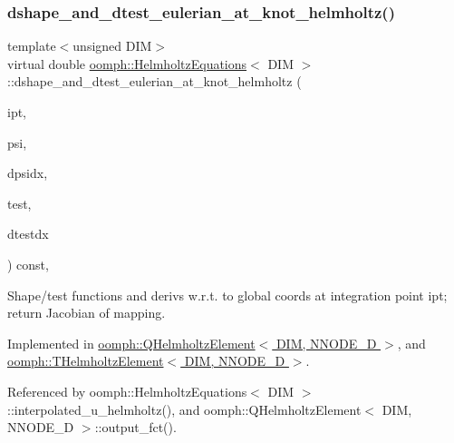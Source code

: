 \subsubsection{\texorpdfstring{dshape\+\_\+and\+\_\+dtest\+\_\+eulerian\+\_\+at\+\_\+knot\+\_\+helmholtz()}{dshape\_and\_dtest\_eulerian\_at\_knot\_helmholtz()}}
{\footnotesize\ttfamily template$<$unsigned D\+IM$>$ \\
virtual double \hyperlink{classoomph_1_1HelmholtzEquations}{oomph\+::\+Helmholtz\+Equations}$<$ D\+IM $>$\+::dshape\+\_\+and\+\_\+dtest\+\_\+eulerian\+\_\+at\+\_\+knot\+\_\+helmholtz (\begin{DoxyParamCaption}\item[{const unsigned \&}]{ipt,  }\item[{\hyperlink{classoomph_1_1Shape}{Shape} \&}]{psi,  }\item[{\hyperlink{classoomph_1_1DShape}{D\+Shape} \&}]{dpsidx,  }\item[{\hyperlink{classoomph_1_1Shape}{Shape} \&}]{test,  }\item[{\hyperlink{classoomph_1_1DShape}{D\+Shape} \&}]{dtestdx }\end{DoxyParamCaption}) const\hspace{0.3cm}{\ttfamily [protected]}, {}}



Shape/test functions and derivs w.\+r.\+t. to global coords at integration point ipt; return Jacobian of mapping. 



Implemented in \hyperlink{classoomph_1_1QHelmholtzElement_ade0cbf9a26ee1ac1f64fd999d8903a72}{oomph\+::\+Q\+Helmholtz\+Element$<$ D\+I\+M, N\+N\+O\+D\+E\+\_\+D $>$}, and \hyperlink{classoomph_1_1THelmholtzElement_abe87fe860e1034b235df82f134a8c7f7}{oomph\+::\+T\+Helmholtz\+Element$<$ D\+I\+M, N\+N\+O\+D\+E\+\_\+D $>$}.



Referenced by oomph\+::\+Helmholtz\+Equations$<$ D\+I\+M $>$\+::interpolated\+\_\+u\+\_\+helmholtz(), and oomph\+::\+Q\+Helmholtz\+Element$<$ D\+I\+M, N\+N\+O\+D\+E\+\_\+D $>$\+::output\+\_\+fct().

\mbox{\label{classoomph_1_1HelmholtzEquations_a9a64bff0cb0c873e50eba0f39ace79f1}} 
